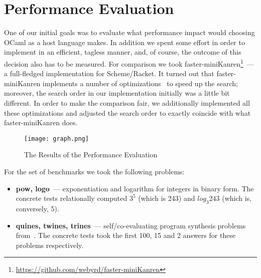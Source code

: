 
\section{Performance Evaluation}
\label{sec:evaluation}

One of our initial goals was to evaluate what performance impact would choosing OCaml as a host language makes. In addition we spent some
effort in order to implement \miniKanren in an efficient, tagless manner, and, of course, the outcome of this decision also has to be
measured. For comparison we took faster-miniKanren\footnote{\url{https://github.com/webyrd/faster-miniKanren}}~--- a full-fledged 
\miniKanren implementation for Scheme/Racket. It turned out that faster-miniKanren implements a number of optimizations~\cite{WillThesis, Optimizations} 
to speed up the search; moreover, the search order in our implementation initially was a little bit different. In order to make the comparison
fair, we additionally implemented all these optimizations and adjusted the search order to exactly coincide with 
what faster-miniKanren does.

\begin{figure}[t]
\centering
\texttt{[image: graph.png]}
\caption{The Results of the Performance Evaluation}
\label{eval}
\end{figure}

\FloatBarrier 

For the set of benchmarks we took the following problems:

\begin{itemize}
\item \textbf{pow, logo}~--- exponentiation and logarithm for integers in binary form. The concrete tests relationally computed
$3^5$ (which is 243) and $log_3 243$ (which is, conversely, 5).
\item \textbf{quines, twines, trines}~--- self/co-evaluating program synthesis problems from~\cite{Untagged}. The
concrete tests took the first 100, 15 and 2 answers for these problems respectively.
\end{itemize}

